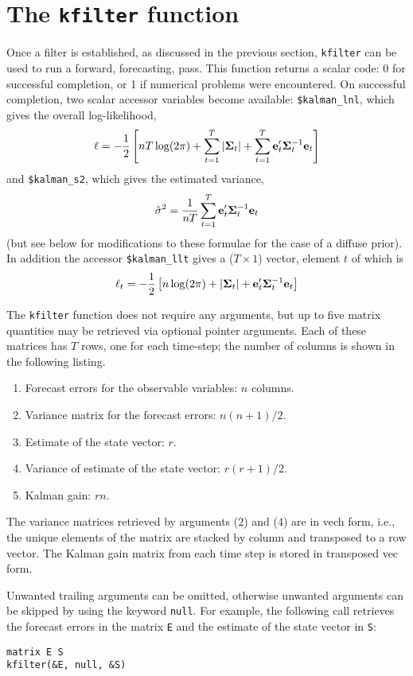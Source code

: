 \documentclass[a4paper]{article}
\newcommand{\prederr}{\ensuremath\mathbf{e}}
\newcommand{\predvar}{\ensuremath{\bm\Sigma}}
\begin{document}
\section{The \texttt{kfilter} function}

Once a filter is established, as discussed in the previous section,
\texttt{kfilter} can be used to run a forward, forecasting, pass.
This function returns a scalar code: 0 for successful completion, or 1
if numerical problems were encountered.  On successful completion, two
scalar accessor variables become available: \verb+$kalman_lnl+, which
gives the overall log-likelihood,
%
\[
  \ell = -\frac{1}{2} \left[nT \log(2 \pi) + \sum_{t=1}^T\left|\predvar_t\right| + 
    \sum_{t=1}^T\prederr_t'\predvar_t^{-1} \prederr_t
  \right]
\]
%
and \verb+$kalman_s2+, which gives the estimated variance,
%
\[
\hat{\sigma}^2 = \frac{1}{nT} 
   \sum_{t=1}^T\prederr_t'\predvar_t^{-1} \prederr_t
\]
(but see below for modifications to these formulae for the case of a
diffuse prior).  In addition the accessor \verb+$kalman_llt+ gives a
($T \times 1$) vector, element $t$ of which is
%
\[
  \ell_t = -\frac{1}{2} \left[n \log(2 \pi) + \left|\predvar_t\right| + 
    \prederr_t'\predvar_t^{-1} \prederr_t
  \right]
\]
%

The \texttt{kfilter} function does not require any arguments, but up
to five matrix quantities may be retrieved via optional pointer
arguments.  Each of these matrices has $T$ rows, one for each
time-step; the number of columns is shown in the following listing.
%
\begin{enumerate}
\item Forecast errors for the observable variables: $n$ columns.
\item Variance matrix for the forecast errors: $n(n+1)/2$.
\item Estimate of the state vector: $r$.
\item Variance of estimate of the state vector: $r(r+1)/2$.
\item Kalman gain: $rn$.
\end{enumerate}

The variance matrices retrieved by arguments (2) and (4) are in vech
form, i.e., the unique elements of the matrix are stacked by column
and transposed to a row vector.  The Kalman gain matrix from each time
step is stored in transposed vec form.

Unwanted trailing arguments can be omitted, otherwise unwanted
arguments can be skipped by using the keyword \texttt{null}.  For
example, the following call retrieves the forecast errors in the
matrix \texttt{E} and the estimate of the state vector in \texttt{S}:
%
\begin{verbatim}
matrix E S
kfilter(&E, null, &S)
\end{verbatim}
\end{document}
